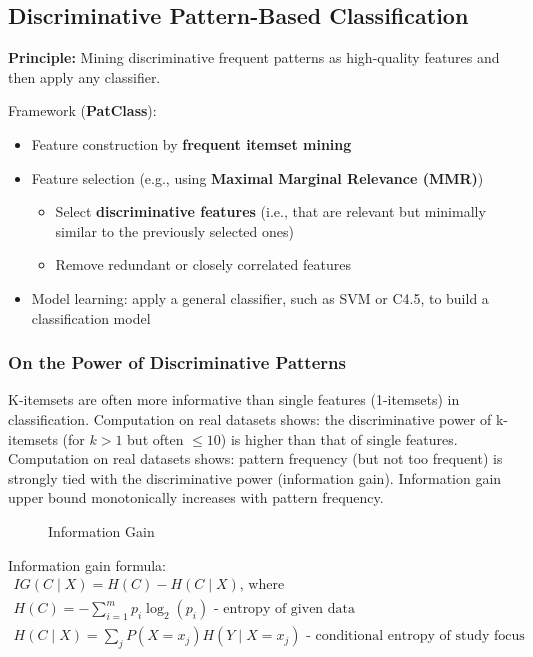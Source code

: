 \subsection{Discriminative Pattern-Based Classification}
\textbf{Principle:} Mining discriminative frequent patterns as high-quality
features and then apply any classifier.

Framework (\textbf{PatClass}):
\begin{itemize}
\item Feature construction by \textbf{frequent itemset mining}
\item Feature selection (e.g., using \textbf{Maximal Marginal Relevance (MMR)})
\begin{itemize}
\item Select \textbf{discriminative features} (i.e., that are relevant but minimally similar to the previously selected ones)
\item Remove redundant or closely correlated features 
\end{itemize}
\item Model learning: apply a general classifier, such as SVM or C4.5, to build a classification model
\end{itemize}

\subsubsection{On the Power of Discriminative Patterns}
K-itemsets are often more informative than single features (1-itemsets) in classification. Computation on real datasets shows: the discriminative power of k-itemsets (for $k > 1$ but often $\leqslant 10$) is higher than that of single features.\\

Computation on real datasets shows: pattern frequency (but not too frequent) is strongly tied with the discriminative power (information gain). Information gain upper bound monotonically increases with pattern frequency.

\begin{figure}[H]
\centering
{}
\quad
{}
\caption{Information Gain}
\label{fig:ig}
\end{figure}

Information gain formula:
\begin{gather*}
IG (C \mid X) = H (C) - H (C \mid X)\text{, where }\\
H(C) = -\sum^{m}_{i=1}p_i \log_2(p_i)\text{ - entropy of given data}\\
H(C \mid X) = \sum_j P(X=x_j) H(Y \mid X=x_j)\text{ - conditional entropy of study focus}
\end{gather*}

